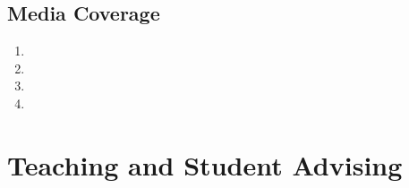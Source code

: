 \documentclass[11pt]{article}
\begin{document}
\subsection{Media Coverage}
\begin{enumerate}[label=M\arabic*]
\item {}
\item {}  
\item {}
\item {}
\end{enumerate}





\section{Teaching and Student Advising}
\end{document}

